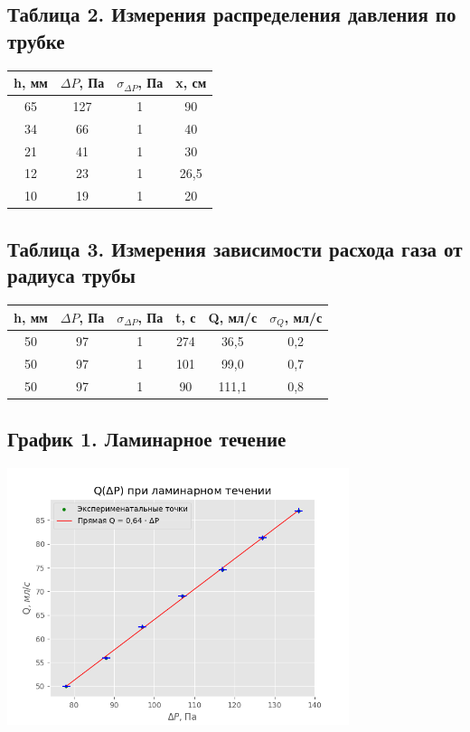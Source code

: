 \documentclass[15pt,a5paper,reqno]{article}
\begin{document}
    \subsection{Таблица 2. Измерения распределения давления по трубке}
    \begin{tabular}{|c|c|c|c|}
        \hline
        h, мм & $\Delta P$, Па & $\sigma_{\Delta P}$, Па & x, см \\ \hline
        65 & 127 & 1 & 90   \\ \hline
        34 & 66  & 1 & 40   \\ \hline   
        21 & 41  & 1 & 30   \\ \hline
        12 & 23  & 1 & 26,5 \\ \hline
        10 & 19  & 1 & 20   \\ \hline
    \end{tabular}
    
    \subsection{Таблица 3. Измерения зависимости расхода газа от радиуса трубы}
    \begin{tabular}{|c|c|c|c|c|c|}
        \hline
        h, мм & $\Delta P$, Па & $\sigma_{\Delta P}$, Па & t, с & Q, мл/с & $\sigma_{Q}$, мл/с \\ \hline
        50 & 97 & 1 & 274 &  36,5 & 0,2       \\ \hline
        50 & 97 & 1 & 101 &  99,0 & 0,7       \\ \hline
        50 & 97 & 1 &  90 & 111,1 & 0,8       \\ \hline
    \end{tabular}

    \newpage
    \subsection{График 1. Ламинарное течение}
    \begin{center}
        \includegraphics[width = 0.75\textwidth]{График 1.png}
    \end{center}
    
\end{document}
